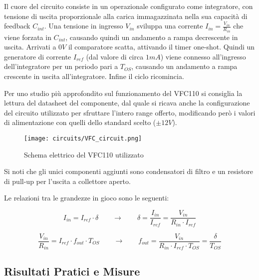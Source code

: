 Il cuore del circuito consiste in un operazionale configurato come integratore, con tensione
di uscita proporzionale alla carica immagazzinata nella sua capacità di feedback $C_{int}$.
Una tensione in ingresso $V_{in}$ sviluppa una corrente $I_{in}=\frac{V_{in}}{R_{in}}$
che viene forzata in $C_{int}$, causando quindi un andamento a rampa decrescente in uscita.
Arrivati a $0V$ il comparatore scatta, attivando il timer one-shot. Quindi un generatore
di corrente $I_{ref}$ (dal valore di circa $1mA$) viene connesso all'ingresso dell'integratore
per un periodo pari a $T_{OS}$, causando un andamento a rampa crescente in uscita
all'integratore. Infine il ciclo ricomincia.

Per uno studio più approfondito sul funzionamento del VFC110 si consiglia la lettura del
datasheet del componente, dal quale si ricava anche la configurazione del circuito utilizzato
per sfruttare l'intero range offerto, modificando però i valori di alimentazione con
quelli dello standard scelto ($\pm 12V$).
\medskip

\begin{figure}[ht]
    \centering
    \texttt{[image: circuits/VFC\_circuit.png]}
    \caption{Schema elettrico del VFC110 utilizzato}
    \label{VFC_circuit}
\end{figure}

Si noti che gli unici componenti aggiunti sono condensatori di filtro e un resistore di
pull-up per l'uscita a collettore aperto.

Le relazioni tra le grandezze in gioco sono le seguenti:

\begin{displaymath}
    I_{in}=I_{ref}\cdot\delta
    \qquad
    \rightarrow
    \qquad
    \delta=\frac{I_{in}}{I_{ref}}=\frac{V_{in}}{R_{in}\cdot I_{ref}}
\end{displaymath}

\begin{displaymath}
    \frac{V_{in}}{R_{in}}=I_{ref}\cdot f_{out}\cdot T_{OS}
    \qquad
    \rightarrow
    \qquad
    f_{out}=\frac{V_{in}}{R_{in}\cdot I_{ref}\cdot T_{OS}}=\frac{\delta}{T_{OS}}
\end{displaymath}


\subsection*{Risultati Pratici e Misure}

